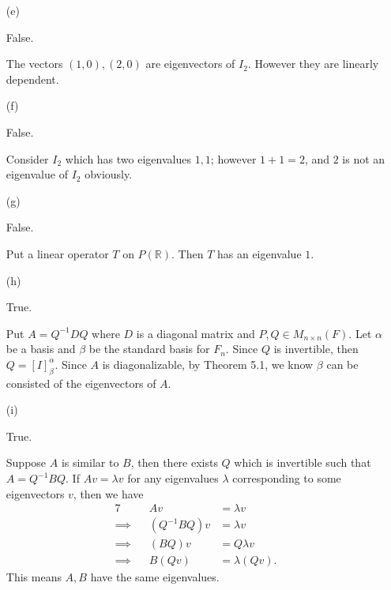 \begin{Exercise}
\begin{enumerate}[(a)]
		\item[(e)]
		\begin{answer}
			False.
		\end{answer}
		\begin{solution}
			The vectors $(1,0),(2,0)$ are eigenvectors of $I_2$. However they are linearly dependent.
		\end{solution}
		
		\item[(f)]
		\begin{answer}
			False.
		\end{answer}
		\begin{solution}
			Consider $I_2$ which has two eigenvalues $1,1$; however $1+1=2$, and $2$ is not an eigenvalue of $I_2$ obviously.
		\end{solution}
		
		\item[(g)]
		\begin{answer}
			False.
		\end{answer}
		\begin{solution}
			Put a linear operator $T$ on $P(\mathbb{R})$. Then $T$ has an eigenvalue $1$.
		\end{solution}
		
		\item[(h)]
		\begin{answer}
			True.
		\end{answer}
		\begin{solution}
			Put $A = Q^{-1} D Q$ where $D$ is a diagonal matrix and $P,Q\in M_{n\times n}(F)$. Let $\alpha$ be a basis and $\beta$ be the standard basis for $F_n$. Since $Q$ is invertible, then $Q = [I]_{\beta}^{\alpha}$. Since $A$ is diagonalizable, by Theorem 5.1, we know $\beta$ can be consisted of the eigenvectors of $A$.
		\end{solution}
		
		\item[(i)]
		\begin{answer}
			True.
		\end{answer}
		\begin{solution}
			Suppose $A$ is similar to $B$, then there exists $Q$ which is invertible such that $A = Q^{-1} B Q$. If $Av = \lambda v$ for any eigenvalues $\lambda$ corresponding to some eigenvectors $v$, then we have
			\begin{alignat*}{7}
			\quad&& Av &= \lambda v \\
			\implies&& (Q^{-1} B Q ) v &= \lambda v \\
			\implies&& (B Q)v &= Q \lambda v \\
			\implies&& B(Q v) &= \lambda (Q v).
			\end{alignat*}
			This means $A,B$ have the same eigenvalues.
		\end{solution}
		

\end{enumerate}
\end{Exercise}
